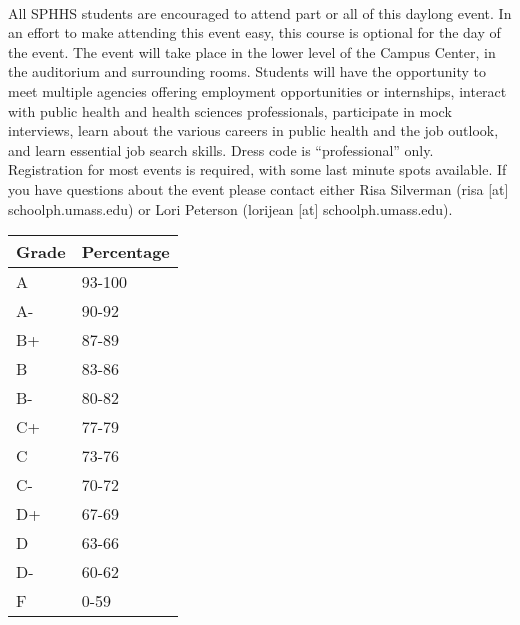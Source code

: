 \documentclass[10pt]{article}
\begin{document}
\\
\noindent All SPHHS students are encouraged to attend part or all of this daylong event.  In an effort to make attending this event easy, this course is optional for the day of the event.  The event will take place in the lower level of the Campus Center, in the auditorium and surrounding rooms. Students will have the opportunity to meet multiple agencies offering employment opportunities or internships, interact with public health and health sciences professionals, participate in mock interviews, learn about the various careers in public health and the job outlook, and learn essential job search skills.  Dress code is “professional” only. Registration for most events is required, with some last minute spots available. If you have questions about the event please contact either Risa Silverman (risa [at] schoolph.umass.edu) or Lori Peterson (lorijean [at] schoolph.umass.edu). 

\bigskip

\begin{table}[htdp]
\begin{tabular}{ll}
Grade & Percentage \\
\hline
A & 93-100 \\
A- & 90-92 \\
B+ & 87-89 \\
B & 83-86 \\
B- & 80-82 \\
C+ & 77-79 \\
C & 73-76 \\
C- & 70-72 \\
D+ & 67-69 \\
D & 63-66 \\
D- & 60-62\\
F & 0-59 \\
\end{tabular}
\end{table}%
\end{document}

